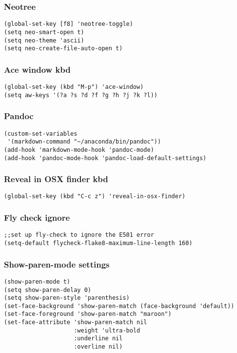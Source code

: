 \documentclass[11pt]{article}
\begin{document}
\subsubsection{Neotree}
\label{sec:orgheadline8}
\begin{verbatim}
(global-set-key [f8] 'neotree-toggle)
(setq neo-smart-open t)
(setq neo-theme 'ascii)
(setq neo-create-file-auto-open t)
\end{verbatim}
\subsubsection{Ace window kbd}
\label{sec:orgheadline9}
\begin{verbatim}
(global-set-key (kbd "M-p") 'ace-window)
(setq aw-keys '(?a ?s ?d ?f ?g ?h ?j ?k ?l))
\end{verbatim}
\subsubsection{Pandoc}
\label{sec:orgheadline10}
\begin{verbatim}
(custom-set-variables
 '(markdown-command "~/anaconda/bin/pandoc"))
(add-hook 'markdown-mode-hook 'pandoc-mode)
(add-hook 'pandoc-mode-hook 'pandoc-load-default-settings)
\end{verbatim}
\subsubsection{Reveal in OSX finder kbd}
\label{sec:orgheadline11}
\begin{verbatim}
(global-set-key (kbd "C-c z") 'reveal-in-osx-finder)
\end{verbatim}
\subsubsection{Fly check ignore}
\label{sec:orgheadline12}
\begin{verbatim}
;;set up fly-check to ignore the E501 error
(setq-default flycheck-flake8-maximum-line-length 160)
\end{verbatim}
\subsubsection{Show-paren-mode settings}
\label{sec:orgheadline13}
\begin{verbatim}
(show-paren-mode t)
(setq show-paren-delay 0)
(setq show-paren-style 'parenthesis)
(set-face-background 'show-paren-match (face-background 'default))
(set-face-foreground 'show-paren-match "maroon")
(set-face-attribute 'show-paren-match nil
                    :weight 'ultra-bold
                    :underline nil
                    :overline nil)
\end{verbatim}
\end{document}
